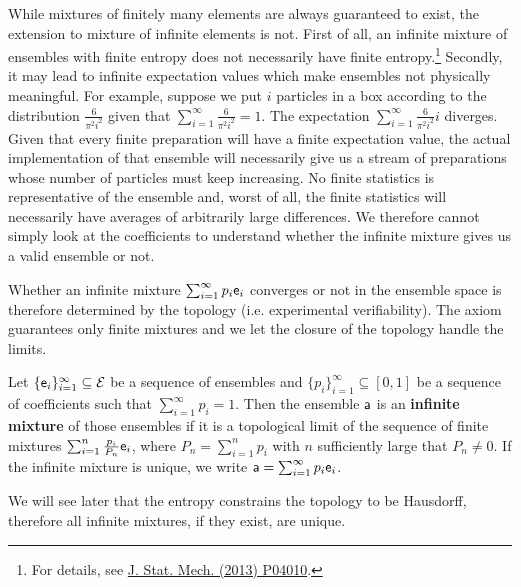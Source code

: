 While mixtures of finitely many elements are always guaranteed to exist, the extension to mixture of infinite elements is not. First of all, an infinite mixture of ensembles with finite entropy does not necessarily have finite entropy.\footnote{For details, see \href{https://arxiv.org/pdf/1212.5630.pdf}{J. Stat. Mech. (2013) P04010}.} Secondly, it may lead to infinite expectation values which make ensembles not physically meaningful. For example, suppose we put $i$ particles in a box according to the distribution $\frac{6}{\pi^2 i^2}$ given that $\sum_{i=1}^{\infty} \frac{6}{\pi^2 i^2}=1$. The expectation $\sum_{i=1}^{\infty} \frac{6}{\pi^2 i^2} i$ diverges. Given that every finite preparation will have a finite expectation value, the actual implementation of that ensemble will necessarily give us a stream of preparations whose number of particles must keep increasing. No finite statistics is representative of the ensemble and, worst of all, the finite statistics will necessarily have averages of arbitrarily large differences. We therefore cannot simply look at the coefficients to understand whether the infinite mixture gives us a valid ensemble or not.

Whether an infinite mixture $\sum_{i=1}^\infty p_i \ens_i$ converges or not in the ensemble space is therefore determined by the topology (i.e. experimental verifiability). The axiom guarantees only finite mixtures and we let the closure of the topology handle the limits.

\begin{mathSection}
\begin{defn}
	Let $\{\ens_i\}_{i=1}^{\infty} \subseteq \Ens$ be a sequence of ensembles and $\{p_i\}_{i=1}^{\infty} \subseteq [0,1]$ be a sequence of coefficients such that $\sum_{i=1}^{\infty} p_i = 1$. Then the ensemble $\ens[a]$ is an \textbf{infinite mixture} of those ensembles if it is a topological limit of the sequence of finite mixtures $\sum_{i=1}^{n} \frac{p_i}{P_n} \ens_i$, where $P_n = \sum_{i=1}^{n} p_i$ with $n$ sufficiently large that $P_n \neq 0$. If the infinite mixture is unique, we write $\ens[a] = \sum_{i=1}^{\infty} p_i \ens_i$.
\end{defn}

\begin{remark}
	We will see later that the entropy constrains the topology to be Hausdorff, therefore all infinite mixtures, if they exist, are unique.
\end{remark}
\end{mathSection}

